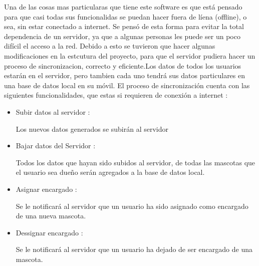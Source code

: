 Una de las cosas mas particularas que tiene este software es que está pensado para que casi todas sus funcionalidas se puedan hacer fuera de líena (offline), o sea, sin estar conectado a internet. Se pensó de esta forma para evitar la total dependencia de un servidor, ya que a algunas personas les puede ser un poco difícil el acceso a la red. Debido a esto se tuvieron que hacer algunas modificaciones en la estcutura del proyecto, para que el servidor pudiera hacer un proceso de sincronizacion, correcto y eficiente.Los datos de todos los usuarios estarán en el servidor, pero tambien cada uno tendrá sus datos particulares en una base de datos local en su móvil. El proceso de sincronización cuenta con las siguientes funcionalidades, que estas si requieren de conexión a internet :
\begin{itemize}
	\item Subir datos al servidor :
	
	Los nuevos datos generados se subirán al servidor
	
	\item Bajar datos del Servidor :
	
	Todos los datos que hayan sido subidos al servidor, de todas las mascotas que el usuario sea dueño serán agregados a la base de datos local. 
	
	\item Asignar encargado :
	
	Se le notificará al servidor que un usuario ha sido asignado como encargado de una nueva mascota.  
	
		\item Dessignar encargado :
	
	Se le notificará al servidor que un usuario ha dejado de ser  encargado de una mascota.  
\end{itemize}

  
 


